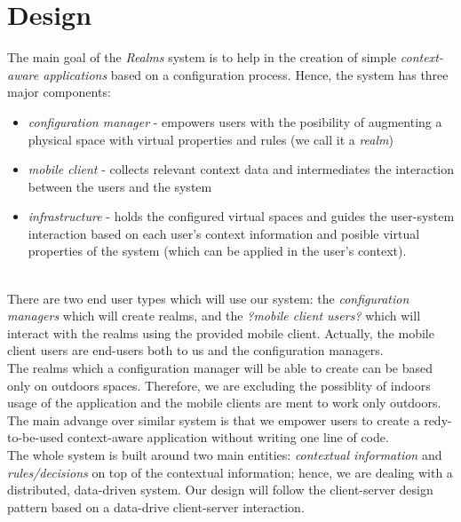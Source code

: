 \section{Design} %
\label{sec:design}
The main goal of the \emph{Realms} system is to help in the creation of simple \emph{context-aware applications} based on a configuration process. Hence, the system has three major components:
\begin{itemize}
	\item \emph{configuration manager} - empowers users with the posibility of augmenting a physical space with virtual properties and rules (we call it a \emph{realm})
	\item \emph{mobile client} - collects relevant context data and intermediates the interaction between the users and the system
	\item \emph{infrastructure} - holds the configured virtual spaces and guides the user-system interaction based on each user's context information and posible virtual properties of the system (which can be applied in the user's context).
\end{itemize}\\

There are two end user types which will use our system: the \emph{configuration managers} which will create realms, and the \emph{?mobile client users?} which will interact with the realms using the provided mobile client. Actually, the mobile client users are end-users both to us and the configuration managers.\\

The realms which a configuration manager will be able to create can be based only on outdoors spaces. Therefore, we are excluding the possiblity of indoors usage of the application and the mobile clients are ment to work only outdoors.\\

The main advange over similar system is that we empower users to create a redy-to-be-used context-aware application without writing one line of code.\\

The whole system is built around two main entities: \emph{contextual information} and \emph{rules/decisions} on top of the contextual information; hence, we are dealing with a distributed, data-driven system. Our design will follow the client-server design pattern based on a data-drive client-server interaction.

